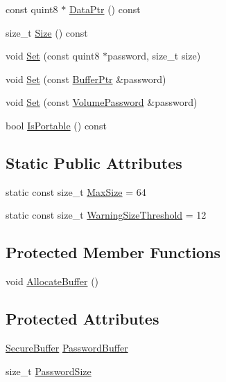 \begin{DoxyCompactItemize}
const quint8 $\ast$ \hyperlink{class_gost_crypt_1_1_volume_1_1_volume_password_adbb8c0326f741a7139635adfde0a9675}{Data\+Ptr} () const
\item 
size\+\_\+t \hyperlink{class_gost_crypt_1_1_volume_1_1_volume_password_ae286c6de4a3d428573ebb903816f624e}{Size} () const
\item 
void \hyperlink{class_gost_crypt_1_1_volume_1_1_volume_password_a5080fc51fe13fb53c560c6bd690260fd}{Set} (const quint8 $\ast$password, size\+\_\+t size)
\item 
void \hyperlink{class_gost_crypt_1_1_volume_1_1_volume_password_ae3b4c39331cb06c544647780a449b77f}{Set} (const \hyperlink{class_gost_crypt_1_1_buffer_ptr}{Buffer\+Ptr} \&password)
\item 
void \hyperlink{class_gost_crypt_1_1_volume_1_1_volume_password_add057b5c4e3be24f365626b8a7ae7e11}{Set} (const \hyperlink{class_gost_crypt_1_1_volume_1_1_volume_password}{Volume\+Password} \&password)
\item 
bool \hyperlink{class_gost_crypt_1_1_volume_1_1_volume_password_a8917c0b286171c2eaf6dddbaa8e520d3}{Is\+Portable} () const
\end{DoxyCompactItemize}
\subsection*{Static Public Attributes}
\begin{DoxyCompactItemize}
\item 
static const size\+\_\+t \hyperlink{class_gost_crypt_1_1_volume_1_1_volume_password_a04e1940c0ea741ec03be55c6bc39a41a}{Max\+Size} = 64
\item 
static const size\+\_\+t \hyperlink{class_gost_crypt_1_1_volume_1_1_volume_password_a56a95d153f41d58b084c752597ff679e}{Warning\+Size\+Threshold} = 12
\end{DoxyCompactItemize}
\subsection*{Protected Member Functions}
\begin{DoxyCompactItemize}
\item 
void \hyperlink{class_gost_crypt_1_1_volume_1_1_volume_password_a32e32d2144fe16ac3c2e77642dd4c439}{Allocate\+Buffer} ()
\end{DoxyCompactItemize}
\subsection*{Protected Attributes}
\begin{DoxyCompactItemize}
\item 
\hyperlink{class_gost_crypt_1_1_secure_buffer}{Secure\+Buffer} \hyperlink{class_gost_crypt_1_1_volume_1_1_volume_password_aed443ff5fdec177290dce2e0a8cb497a}{Password\+Buffer}
\item 
size\+\_\+t \hyperlink{class_gost_crypt_1_1_volume_1_1_volume_password_ae4f42cea499aa251a62bd49e22c5c44d}{Password\+Size}
\end{DoxyCompactItemize}


